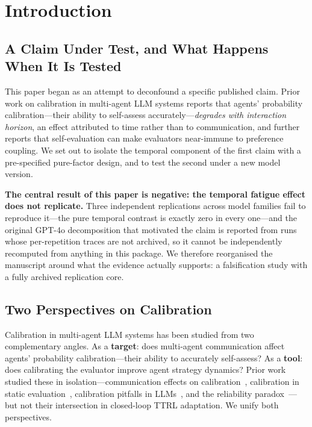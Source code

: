 \documentclass[11pt]{article}
\theoremstyle{definition}
\theoremstyle{remark}
\begin{document}
\section{Introduction}

\subsection{A Claim Under Test, and What Happens When It Is Tested}

This paper began as an attempt to deconfound a specific published claim. Prior work on calibration in multi-agent LLM systems reports that agents' probability calibration---their ability to self-assess accurately---\emph{degrades with interaction horizon}, an effect attributed to time rather than to communication, and further reports that self-evaluation can make evaluators near-immune to preference coupling. We set out to isolate the temporal component of the first claim with a pre-specified pure-factor design, and to test the second under a new model version.

\textbf{The central result of this paper is negative: the temporal fatigue effect does not replicate.} Three independent replications across model families fail to reproduce it---the pure temporal contrast is exactly zero in every one---and the original GPT-4o decomposition that motivated the claim is reported from runs whose per-repetition traces are not archived, so it cannot be independently recomputed from anything in this package. We therefore reorganised the manuscript around what the evidence actually supports: a falsification study with a fully archived replication core.

\subsection{Two Perspectives on Calibration}

Calibration in multi-agent LLM systems has been studied from two complementary angles. As a \textbf{target}: does multi-agent communication affect agents' probability calibration---their ability to accurately self-assess? As a \textbf{tool}: does calibrating the evaluator improve agent strategy dynamics? Prior work studied these in isolation---communication effects on calibration~\citep{huang2026cagecal}, calibration in static evaluation~\citep{guo2017calibration}, calibration pitfalls in LLMs~\citep{tian2023calibration}, and the reliability paradox~\citep{messing2026tee}---but not their intersection in closed-loop TTRL adaptation. We unify both perspectives.
\end{document}
